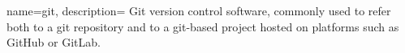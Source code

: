 
{%
    name={git},
    description={
    Git version control software, commonly used to refer both to a git repository and to a git-based project hosted on platforms such as GitHub or GitLab.
    }
}


